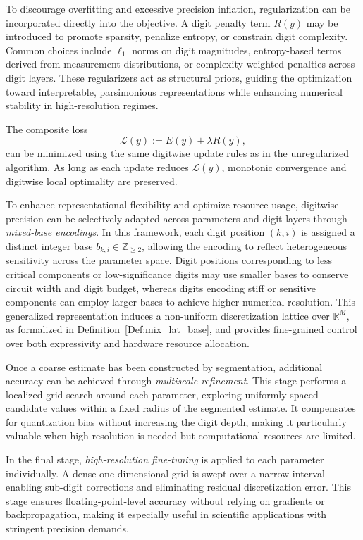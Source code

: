 \documentclass[aps,twocolumn,superscriptaddress,nofootinbib]{revtex4}
\begin{document}
To discourage overfitting and excessive precision inflation, regularization can be incorporated directly into the objective. A digit penalty term $R(y)$ may be introduced to promote sparsity, penalize entropy, or constrain digit complexity. Common choices include $\ell_1$ norms on digit magnitudes, entropy-based terms derived from measurement distributions, or complexity-weighted penalties across digit layers. These regularizers act as structural priors, guiding the optimization toward interpretable, parsimonious representations while enhancing numerical stability in high-resolution regimes.

The composite loss
\begin{equation}
    \mathcal{L}(y) := E(y) + \lambda R(y), \label{eq:regularized-global}
\end{equation}
can be minimized using the same digitwise update rules as in the unregularized algorithm. As long as each update reduces $\mathcal{L}(y)$, monotonic convergence and digitwise local optimality are preserved.

To enhance representational flexibility and optimize resource usage, digitwise precision can be selectively adapted across parameters and digit layers through \emph{mixed-base encodings}. In this framework, each digit position $(k,i)$ is assigned a distinct integer base $b_{k,i} \in \mathbb{Z}_{\geq 2}$, allowing the encoding to reflect heterogeneous sensitivity across the parameter space. Digit positions corresponding to less critical components or low-significance digits may use smaller bases to conserve circuit width and digit budget, whereas digits encoding stiff or sensitive components can employ larger bases to achieve higher numerical resolution. This generalized representation induces a non-uniform discretization lattice over $\mathbb{R}^M$, as formalized in Definition~\ref{Def:mix_lat_base}, and provides fine-grained control over both expressivity and hardware resource allocation.


Once a coarse estimate has been constructed by segmentation, additional accuracy can be achieved through \emph{multiscale refinement}. This stage performs a localized grid search around each parameter, exploring uniformly spaced candidate values within a fixed radius of the segmented estimate. It compensates for quantization bias without increasing the digit depth, making it particularly valuable when high resolution is needed but computational resources are limited.

In the final stage, \emph{high-resolution fine-tuning} is applied to each parameter individually. A dense one-dimensional grid is swept over a narrow interval enabling sub-digit corrections and eliminating residual discretization error. This stage ensures floating-point-level accuracy without relying on gradients or backpropagation, making it especially useful in scientific applications with stringent precision demands.
\end{document}
